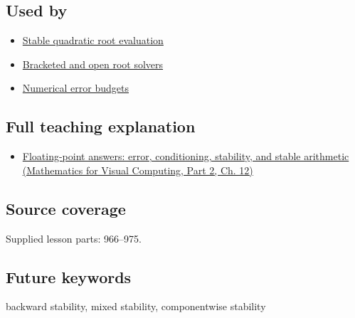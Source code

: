 \subsection{Used by}\label{appendix-aa2bf0d79639-used-by}

\hypertarget{appendix-aa2bf0d79639-used-by}{}

\begin{itemize}
\tightlist
\item
  \hyperref[appendix-b9afba7f63e5]{Stable quadratic root evaluation}
\item
  \hyperref[appendix-f63eb850796d]{Bracketed and open root solvers}
\item
  \hyperref[appendix-31b8c295e05f]{Numerical error budgets}
\end{itemize}

\subsection{Full teaching explanation}\label{appendix-aa2bf0d79639-full-teaching-explanation}

\hypertarget{appendix-aa2bf0d79639-full-teaching-explanation}{}

\begin{itemize}
\tightlist
\item
  \href{../02-Mathematics-for-Visual-Computing-P02/main.pdf\#02-foundations-ii-ch028-floating-point-answers-error-conditioning-stability-and-stable-arithmetic}{Floating-point answers: error, conditioning, stability, and stable arithmetic (Mathematics for Visual Computing, Part 2, Ch. 12)}
\end{itemize}

\subsection{Source coverage}\label{appendix-aa2bf0d79639-source-coverage}

\hypertarget{appendix-aa2bf0d79639-source-coverage}{}

Supplied lesson parts: 966--975.

\subsection{Future keywords}\label{appendix-aa2bf0d79639-future-keywords}

\hypertarget{appendix-aa2bf0d79639-future-keywords}{}

backward stability, mixed stability, componentwise stability
